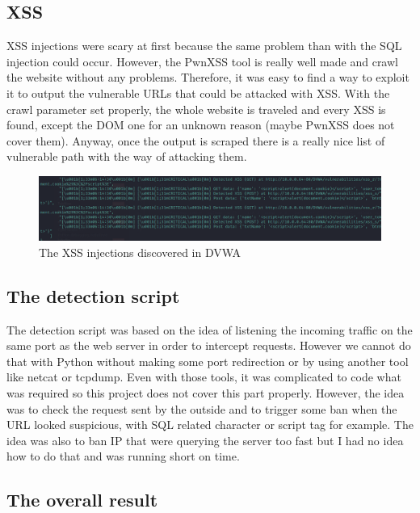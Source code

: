 \documentclass[a4paper,12pt,fleqn]{article}
\begin{document}
\subsection{XSS}

XSS injections were scary at first because the same problem than with the SQL injection could occur. However, the PwnXSS tool is really well made and crawl the website without any problems. Therefore, it was easy to find a way to exploit it to output the vulnerable URLs that could be attacked with XSS. With the crawl parameter set properly, the whole website is traveled and every XSS is found, except the DOM one for an unknown reason (maybe PwnXSS does not cover them). Anyway, once the output is scraped there is a really nice list of vulnerable path with the way of attacking them.

\begin{figure}[h]
    \centering
    \includegraphics[scale = 0.5]{images/xss.png}
    \caption{The XSS injections discovered in DVWA}
\end{figure}

\subsection{The detection script}

The detection script was based on the idea of listening the incoming traffic on the same port as the web server in order to intercept requests. However we cannot do that with Python without making some port redirection or by using another tool like netcat or tcpdump. Even with those tools, it was complicated to code what was required so this project does not cover this part properly. However, the idea was to check the request sent by the outside and to trigger some ban when the URL looked suspicious, with SQL related character or script tag for example. The idea was also to ban IP that were querying the server too fast but I had no idea how to do that and was running short on time.


\subsection{The overall result}
\end{document}
